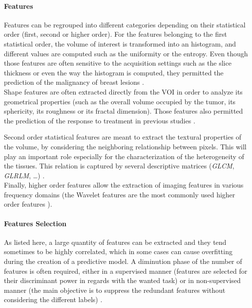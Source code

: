 \documentclass[]{article}
\let\oldparagraph\paragraph
\renewcommand{\paragraph}[1]{\oldparagraph{#1}\mbox{}}
\begin{document}
\paragraph{Features}\label{features}

Features can be regrouped into different categories depending on their
statistical order (first, second or higher order). For the features
belonging to the first statistical order, the volume of interest is
transformed into an histogram, and different values are computed such as
the uniformity or the entropy. Even though those features are often
sensitive to the acquisition settings such as the slice thickness or
even the way the histogram is computed, they permitted the prediction of
the malignancy of breast lesions \cite{Parekh2016}.\\
Shape features are often extracted directly from the VOI in order to
analyze its geometrical properties (such as the overall volume occupied
by the tumor, its sphericity, its roughness or its fractal dimension).
Those features also permitted the prediction of the response to
treatment in previous studies \cite{Thawani2018}.

Second order statistical features are meant to extract the textural
properties of the volume, by considering the neighboring relationship
between pixels. This will play an important role especially for the
characterization of the heterogeneity of the tissues. This relation is
captured by several descriptive matrices (\emph{GLCM}, \emph{GLRLM},
\ldots{}) \cite{Parekh2016}.\\
Finally, higher order features allow the extraction of imaging features
in various frequency domains (the Wavelet features are the most commonly
used higher order features \cite{Thawani2018}).

\paragraph{Features Selection}\label{features-selection}

As listed here, a large quantity of features can be extracted and they
tend sometimes to be highly correlated, which in some cases can cause
overfitting during the creation of a predictive model. A diminution
phase of the number of features is often required, either in a
supervised manner (features are selected for their discriminant power in
regards with the wanted task) or in non-supervised manner (the main
objective is to suppress the redundant features without considering the
different labels) \cite{Parekh2016}.
\end{document}
